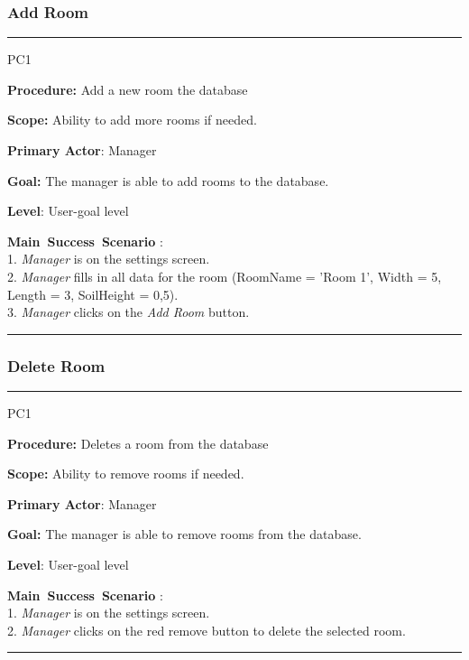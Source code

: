 \subsubsection{Add Room}

\vspace{0.5cm}
\hrule
\hfill \break
\begin{lyxlist}{PC1}
\small{
\item [\textbf{Procedure:}] Add a new room the database
\item [\textbf{Scope:}] Ability to add more rooms if needed.
\item [\textbf{Primary Actor}:] Manager
\item [\textbf{Goal:}] The manager is able to add rooms to the database.
\item [\textbf{Level}:] User-goal level
\item [\textbf{Main~Success~Scenario}]:\\
1. \emph{Manager} is on the settings screen. \\
2. \emph{Manager} fills in all data for the room (RoomName = 'Room 1', Width
= 5, Length = 3, SoilHeight = 0,5).\\
3. \emph{Manager} clicks on the \emph{Add Room} button.
}
\end{lyxlist}
\hrule
\vspace{0.5cm}

\subsubsection{Delete Room}

\vspace{0.5cm}
\hrule
\hfill \break
\begin{lyxlist}{PC1}
\small{
\item [\textbf{Procedure:}] Deletes a room from the database
\item [\textbf{Scope:}] Ability to remove rooms if needed.
\item [\textbf{Primary Actor}:] Manager
\item [\textbf{Goal:}] The manager is able to remove rooms from the database.
\item [\textbf{Level}:] User-goal level
\item [\textbf{Main~Success~Scenario}]:\\
1. \emph{Manager} is on the settings screen. \\
2. \emph{Manager} clicks on the red remove button to delete the selected room.
}
\end{lyxlist}
\hrule
\vspace{0.5cm}
\break




